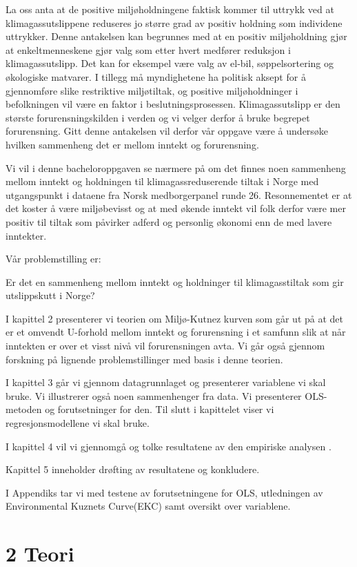 \documentclass[
  12pt,
  letterpaper,
  DIV=11,
  numbers=noendperiod]{scrartcl}
\begin{document}
La oss anta at de positive miljøholdningene faktisk kommer til uttrykk
ved at klimagassutslippene reduseres jo større grad av positiv holdning
som individene uttrykker. Denne antakelsen kan begrunnes med at en
positiv miljøholdning gjør at enkeltmenneskene gjør valg som etter hvert
medfører reduksjon i klimagassutslipp. Det kan for eksempel være valg av
el-bil, søppelsortering og økologiske matvarer. I tillegg må
myndighetene ha politisk aksept for å gjennomføre slike restriktive
miljøtiltak, og positive miljøholdninger i befolkningen vil være en
faktor i beslutningsprosessen. Klimagassutslipp er den største
forurensningskilden i verden og vi velger derfor å bruke begrepet
forurensning. Gitt denne antakelsen vil derfor vår oppgave være å
undersøke hvilken sammenheng det er mellom inntekt og forurensning.

Vi vil i denne bacheloroppgaven se nærmere på om det finnes noen
sammenheng mellom inntekt og holdningen til klimagassreduserende tiltak
i Norge med utgangspunkt i dataene fra Norsk medborgerpanel runde 26.
Resonnementet er at det koster å være miljøbevisst og at med økende
inntekt vil folk derfor være mer positiv til tiltak som påvirker adferd
og personlig økonomi enn de med lavere inntekter.

Vår problemstilling er:

Er det en sammenheng mellom inntekt og holdninger til klimagasstiltak
som gir utslippskutt i Norge?

I kapittel 2 presenterer vi teorien om Miljø-Kutnez kurven som går ut på
at det er et omvendt U-forhold mellom inntekt og forurensning i et
samfunn slik at når inntekten er over et visst nivå vil forurensningen
avta. Vi går også gjennom forskning på lignende problemstillinger med
basis i denne teorien.

I kapittel 3 går vi gjennom datagrunnlaget og presenterer variablene vi
skal bruke. Vi illustrerer også noen sammenhenger fra data. Vi
presenterer OLS-metoden og forutsetninger for den. Til slutt i
kapittelet viser vi regresjonsmodellene vi skal bruke.

I kapittel 4 vil vi gjennomgå og tolke resultatene av den empiriske
analysen .

Kapittel 5 inneholder drøfting av resultatene og konkludere.

I Appendiks tar vi med testene av forutsetningene for OLS, utledningen
av Environmental Kuznets Curve(EKC) samt oversikt over variablene.

\newpage

\hypertarget{teori}{%
\section{2 Teori}\label{teori}}
\end{document}
